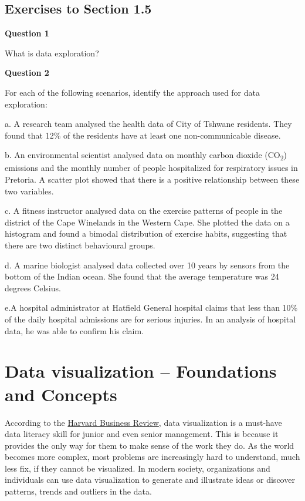\documentclass[
]{book}
\begin{document}
\subsection{Exercises to Section 1.5}\label{exercises-to-section-1.5}

\textbf{Question 1}

What is data exploration?

\textbf{Question 2}

For each of the following scenarios, identify the approach used for data exploration:

a. A research team analysed the health data of City of Tshwane residents. They found that 12\% of the residents have at least one non-communicable disease.

b. An environmental scientist analysed data on monthly carbon dioxide (CO\textsubscript{2}) emissions and the monthly number of people hospitalized for respiratory issues in Pretoria. A scatter plot showed that there is a positive relationship between these two variables.

c. A fitness instructor analysed data on the exercise patterns of people in the district of the Cape Winelands in the Western Cape. She plotted the data on a histogram and found a bimodal distribution of exercise habits, suggesting that there are two distinct behavioural groups.

d. A marine biologist analysed data collected over 10 years by sensors from the bottom of the Indian ocean. She found that the average temperature was 24 degrees Celsius.

e.A hospital administrator at Hatfield General hospital claims that less than 10\% of the daily hospital admissions are for serious injuries. In an analysis of hospital data, he was able to confirm his claim.

\newpage

\section{Data visualization -- Foundations and Concepts}\label{sec1-6}

According to the \href{https://hbr.org/2016/06/visualizations-that-really-work}{Harvard Business Review}, data visualization is a must-have data literacy skill for junior and even senior management. This is because it provides the only way for them to make sense of the work they do. As the world becomes more complex, most problems are increasingly hard to understand, much less fix, if they cannot be visualized. In modern society, organizations and individuals can use data visualization to generate and illustrate ideas or discover patterns, trends and outliers in the data.
\end{document}
